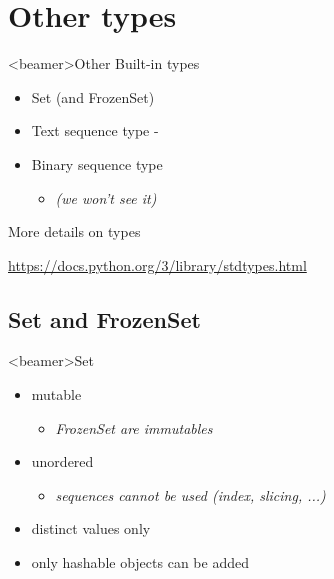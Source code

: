 \section{Other types}

\begin{frame}<beamer>{Other Built-in types}

  \begin{itemize}
    \item<1-> Set (and FrozenSet)
    \item<1-> Text sequence type - 
    \item<1-> Binary sequence type
      \begin{itemize}
      \item<2-> \textit{(we won't see it)}
      \end{itemize}
  \end{itemize}

  \begin{center}

  \bigskip

  More details on types

  \url{https://docs.python.org/3/library/stdtypes.html}

  \end{center}

\end{frame}

\subsection{Set and FrozenSet}

\begin{frame}<beamer>{Set}

  \begin{itemize}
    \item<1-> mutable
    \begin{itemize}
      \item<2-> \textit{FrozenSet are immutables}
    \end{itemize}
    \item<3-> unordered
    \begin{itemize}
      \item<4-> \textit{sequences cannot be used (index, slicing, ...)}
    \end{itemize}
    \item<5-> distinct values only
    \item<6-> only hashable objects can be added
  \end{itemize}

\end{frame}


